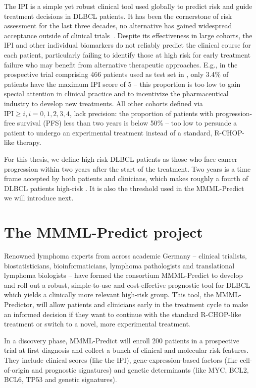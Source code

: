 The IPI is a simple yet robust clinical tool used globally to predict risk and guide 
treatment decisions in DLBCL patients. It has been the cornerstone of risk assessment for the last 
three decades, no alternative has gained widespread acceptance outside of clinical 
trials~\citep{ipi-stay-strong}. 
Despite its effectiveness in large cohorts, the IPI and other individual 
biomarkers do not reliably predict the clinical course for each patient, particularly failing to 
identify those at high risk for early treatment failure who may benefit from alternative therapeutic 
approaches. E.g., in the prospective trial comprising \num{466} patients used as test set in 
\citep{staiger20}, only \num{3.4}\% of patients have the maximum IPI score of 5 -- this proportion 
is too low 
to gain special attention in clinical practice and to incentivize the pharmaceutical industry to 
develop new treatments. All other cohorts defined via $\text{IPI} \geq i, i = 0, 1, 2, 3, 4$, lack 
precision: the proportion of patients with progression-free survival (PFS) less than two years is below 
\num{50}\% -- too low to persuade a patient to undergo an experimental treatment instead of a 
standard, R-CHOP-like therapy.

For this thesis, we define high-risk DLBCL patients as those who face cancer progression 
within two years after the start of the treatment. Two years is a time frame accepted by both 
patients and clinicians, which makes roughly a fourth of DLBCL patients high-risk \cite{staiger20}.
It is also the threshold used in the MMML-Predict we will introduce next.

\section{The MMML-Predict project} \label{sec:intro-mmml}

Renowned lymphoma experts from across academic Germany -- clinical trialists, biostatisticians, 
bioinformaticians, lymphoma pathologists and translational lymphoma biologists -- have formed the 
consortium MMML-Predict to develop and roll out a robust, simple-to-use and cost-effective 
prognostic tool for DLBCL 
which yields a clinically more relevant high-risk group. This tool, the MMML-Predictor, will allow 
patients and clinicians early in the treatment cycle to make an informed decision if they want to 
continue with the standard R-CHOP-like treatment or switch to a novel, more experimental treatment. 

In a discovery phase, MMML-Predict will enroll \num{200} patients in a prospective trial at first 
diagnosis and collect a bunch of clinical and molecular risk features.
They include clinical scores (like the IPI), gene-expression-based factors (like cell-of-origin and 
prognostic signatures) and genetic determinants (like MYC, BCL2, BCL6, TP53 and genetic
signatures). 

